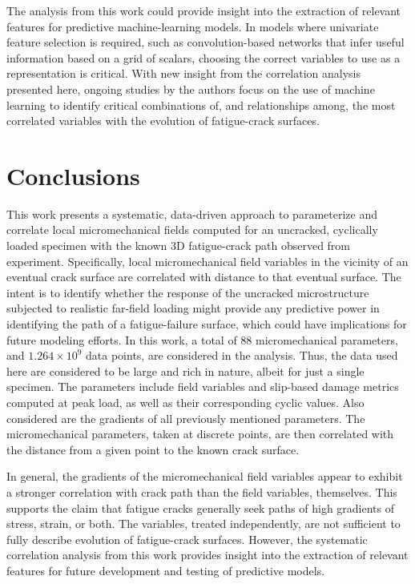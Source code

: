 The analysis from this work could provide insight into the extraction of relevant features for predictive machine-learning models. In models where univariate feature selection is required, such as convolution-based networks that infer useful information based on a grid of scalars, choosing the correct variables to use as a representation is critical. With new insight from the correlation analysis presented here, ongoing studies by the authors focus on the use of machine learning to identify critical combinations of, and relationships among, the most correlated variables with the evolution of fatigue-crack surfaces.

\section{Conclusions}
This work presents a systematic, data-driven approach to parameterize and correlate local micromechanical fields computed for an uncracked, cyclically loaded specimen with the known 3D fatigue-crack path observed from experiment. Specifically, local micromechanical field variables in the vicinity of an eventual crack surface are correlated with distance to that eventual surface. The intent is to identify whether the response of the uncracked microstructure subjected to realistic far-field loading might provide any predictive power in identifying the path of a fatigue-failure surface, which could have implications for future modeling efforts. In this work, a total of 88 micromechanical parameters, and $1.264\times 10^{9}$ data points, are considered in the analysis. Thus, the data used here are considered to be large and rich in nature, albeit for just a single specimen. The parameters include field variables and slip-based damage metrics computed at peak load, as well as their corresponding cyclic values. Also considered are the gradients of all previously mentioned parameters. The micromechanical parameters, taken at discrete points, are then correlated with the distance from a given point to the known crack surface. 

In general, the gradients of the micromechanical field variables appear to exhibit a stronger correlation with crack path than the field variables, themselves. This supports the claim that fatigue cracks generally seek paths of high gradients of stress, strain, or both. The variables, treated independently, are not sufficient to fully describe evolution of fatigue-crack surfaces. However, the systematic correlation analysis from this work provides insight into the extraction of relevant features for future development and testing of predictive models.

